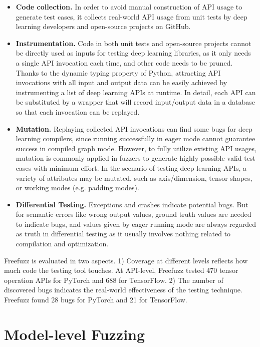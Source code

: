\begin{survey}
\begin{itemize}
    \item \textbf{Code collection.} In order to avoid manual construction of API usage to generate test cases, it collects real-world API usage from unit tests by deep learning developers and open-source projects on GitHub.
    \item \textbf{Instrumentation.} Code in both unit tests and open-source projects cannot be directly used as inputs for testing deep learning libraries, as it only needs a single API invocation each time, and other code needs to be pruned. Thanks to the dynamic typing property of Python, attracting API invocations with all input and output data can be easily achieved by instrumenting a list of deep learning APIs at runtime. In detail, each API can be substituted by a wrapper that will record input/output data in a database so that each invocation can be replayed.
    \item \textbf{Mutation.} Replaying collected API invocations can find some bugs for deep learning compilers, since running successfully in eager mode cannot guarantee success in compiled graph mode. However, to fully utilize existing API usages, mutation is commonly applied in fuzzers to generate highly possible valid test cases with minimum effort. In the scenario of testing deep learning APIs, a variety of attributes may be mutated, such as axis/dimension, tensor shapes, or working modes (e.g. padding modes).
    \item \textbf{Differential Testing.} Exceptions and crashes indicate potential bugs. But for semantic errors like wrong output values, ground truth values are needed to indicate bugs, and values given by eager running mode are always regarded as truth in differential testing as it usually involves nothing related to compilation and optimization.
\end{itemize}

Freefuzz is evaluated in two aspects. 1) Coverage at different levels reflects how much code the testing tool touches. At API-level, Freefuzz tested 470 tensor operation APIs for PyTorch and 688 for TensorFlow. 2) The number of discovered bugs indicates the real-world effectiveness of the testing technique. Freefuzz found 28 bugs for PyTorch and 21 for TensorFlow.

\section{Model-level Fuzzing}


\end{survey}
